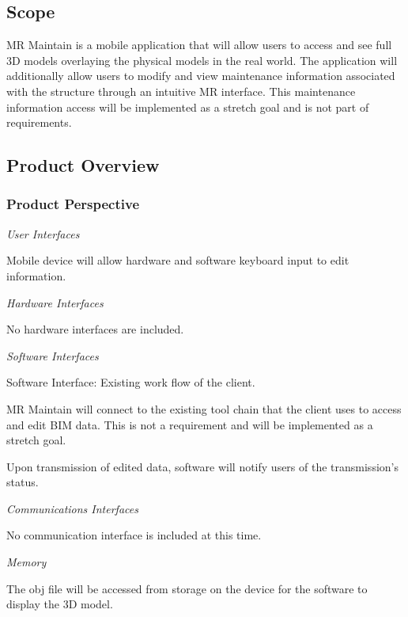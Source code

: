 \documentclass[onecolumn, draftclsnofoot,10pt, compsoc]{IEEEtran}
\begin{document}
    \subsection{Scope}
    MR Maintain is a mobile application that will allow users to access and see full 3D models overlaying the physical models in the real world. The application will additionally allow users to modify and view maintenance information associated with the structure through an intuitive MR interface. This maintenance information access will be implemented as a stretch goal and is not part of requirements.\par
        \subsection{Product Overview}
            \subsubsection{Product Perspective}
            \textit{User Interfaces}\par
            \hangindent=10mm\noindent Mobile device will allow hardware and software keyboard input to edit information.\par
            \textit{Hardware Interfaces}\par
            \hangindent=10mm\noindent No hardware interfaces are included.\par
            \textit{Software Interfaces}\par
            \noindent\hspace{10mm}Software Interface: Existing work flow of the client.\par
            \hangindent=15mm\noindent MR Maintain will connect to the existing tool chain that the client uses to access and edit BIM data. This is not a requirement and will be implemented as a stretch goal.\par
            \noindent{}\hspace{15mm}Upon transmission of edited data, software will notify users of the transmission's status.\par
            \textit{Communications Interfaces}\par
            \hangindent=10mm\noindent No communication interface is included at this time.\par
            \textit{Memory}\par
            \hangindent=10mm\noindent The obj file will be accessed from storage on the device for the software to display the 3D model. \par
\end{document}
